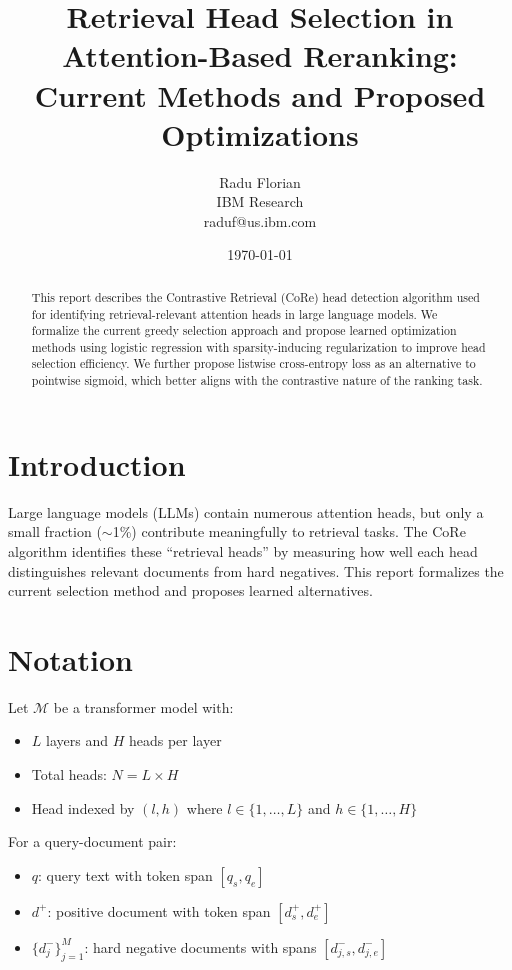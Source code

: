 \documentclass[11pt,a4paper]{article}
\title{Retrieval Head Selection in Attention-Based Reranking:\\Current Methods and Proposed Optimizations}
\author{Radu Florian\\IBM Research\\raduf@us.ibm.com}
\date{\today}
\begin{document}
\maketitle

\begin{abstract}
This report describes the Contrastive Retrieval (CoRe) head detection algorithm used for identifying retrieval-relevant attention heads in large language models. We formalize the current greedy selection approach and propose learned optimization methods using logistic regression with sparsity-inducing regularization to improve head selection efficiency. We further propose listwise cross-entropy loss as an alternative to pointwise sigmoid, which better aligns with the contrastive nature of the ranking task.
\end{abstract}

\section{Introduction}

Large language models (LLMs) contain numerous attention heads, but only a small fraction ($\sim$1\%) contribute meaningfully to retrieval tasks. The CoRe algorithm \cite{core} identifies these ``retrieval heads'' by measuring how well each head distinguishes relevant documents from hard negatives. This report formalizes the current selection method and proposes learned alternatives.

\section{Notation}

Let $\mathcal{M}$ be a transformer model with:
\begin{itemize}
    \item $L$ layers and $H$ heads per layer
    \item Total heads: $N = L \times H$
    \item Head indexed by $(l, h)$ where $l \in \{1, \ldots, L\}$ and $h \in \{1, \ldots, H\}$
\end{itemize}

For a query-document pair:
\begin{itemize}
    \item $q$: query text with token span $[q_s, q_e]$
    \item $d^+$: positive document with token span $[d^+_s, d^+_e]$
    \item $\{d^-_j\}_{j=1}^{M}$: hard negative documents with spans $[d^-_{j,s}, d^-_{j,e}]$
\end{itemize}
\end{document}
